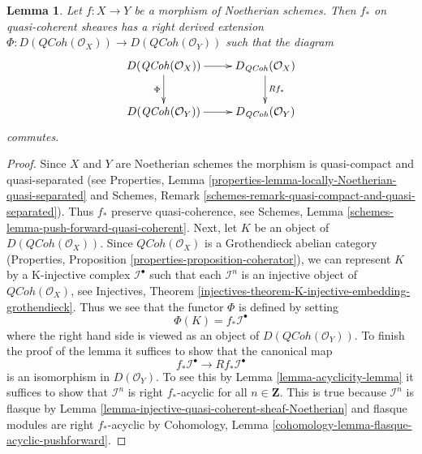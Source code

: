 \documentclass{stacks-project}
\theoremstyle{plain}
\newtheorem{lemma}[subsection]{Lemma}
\theoremstyle{definition}
\theoremstyle{remark}
\numberwithin{equation}{subsection}
\def\QCoh{\mathit{QCoh}}
\begin{document}
\begin{lemma}
\label{lemma-Noetherian-pushforward}
Let $f : X \to Y$ be a morphism of Noetherian schemes.
Then $f_*$ on quasi-coherent sheaves has a right derived
extension
$\Phi : D(\QCoh(\mathcal{O}_X)) \to D(\QCoh(\mathcal{O}_Y))$
such that the diagram
$$
\xymatrix{
D(\QCoh(\mathcal{O}_X)) \ar[d]_{\Phi} \ar[r] &
D_\QCoh(\mathcal{O}_X) \ar[d]^{Rf_*} \\
D(\QCoh(\mathcal{O}_Y)) \ar[r] &
D_\QCoh(\mathcal{O}_Y)
}
$$
commutes.
\end{lemma}

\begin{proof}
Since $X$ and $Y$ are Noetherian schemes the morphism is quasi-compact
and quasi-separated (see
Properties, Lemma \ref{properties-lemma-locally-Noetherian-quasi-separated}
and
Schemes, Remark \ref{schemes-remark-quasi-compact-and-quasi-separated}).
Thus $f_*$ preserve quasi-coherence, see
Schemes, Lemma \ref{schemes-lemma-push-forward-quasi-coherent}.
Next, let $K$ be an object of $D(\QCoh(\mathcal{O}_X))$.
Since $\QCoh(\mathcal{O}_X)$ is a Grothendieck abelian category
(Properties, Proposition \ref{properties-proposition-coherator}), we can
represent $K$ by a K-injective complex $\mathcal{I}^\bullet$
such that each $\mathcal{I}^n$ is an injective object of
$\QCoh(\mathcal{O}_X)$, see
Injectives, Theorem
\ref{injectives-theorem-K-injective-embedding-grothendieck}.
Thus we see that the functor $\Phi$ is defined by setting
$$
\Phi(K) = f_*\mathcal{I}^\bullet
$$
where the right hand side is viewed as an object of
$D(\QCoh(\mathcal{O}_Y))$. To finish the proof of the lemma
it suffices to show that the canonical map
$$
f_*\mathcal{I}^\bullet \longrightarrow Rf_*\mathcal{I}^\bullet
$$
is an isomorphism in $D(\mathcal{O}_Y)$. To see this by
Lemma \ref{lemma-acyclicity-lemma}
it suffices to show that $\mathcal{I}^n$ is right
$f_*$-acyclic for all $n \in \mathbf{Z}$.
This is true because $\mathcal{I}^n$ is flasque by
Lemma \ref{lemma-injective-quasi-coherent-sheaf-Noetherian}
and flasque modules are right $f_*$-acyclic by
Cohomology, Lemma \ref{cohomology-lemma-flasque-acyclic-pushforward}.
\end{proof}
\end{document}
